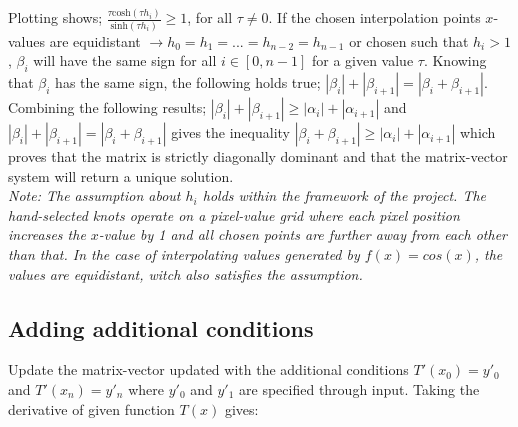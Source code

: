 \documentclass{article}
\newcommand{\T}[2]{\textbf{Task #1} -- #2:\\}
\begin{document}
  Plotting shows; $\frac{\tau \mathrm{cosh}(\tau h_i)}{\mathrm{sinh}(\tau h_i)}
  \geq 1$, for all $\tau \neq 0 $. If the chosen interpolation points
  $x$-values are equidistant $\rightarrow h_0 = h_1 = ... = h_{n-2} = h_{n-1}$ or
  chosen such that $h_i > 1$, $\beta_i$ will have the same sign for all $i \in
  [0,n-1]$ for a given value $\tau$. Knowing that $\beta_i$ has the same sign, the
  following holds true; $|\beta_i| + |\beta_{i+1}| = |\beta_i + \beta_{i+1}|$.
  \\

  Combining the following results; $ |\beta_i| + |\beta_{i+1}| \geq |\alpha_i|
  + |\alpha_{i+1}| $ and $|\beta_i| + |\beta_{i+1}| =
  |\beta_i + \beta_{i+1}|$ gives the inequality $|\beta_i + \beta_{i+1}| \geq |\alpha_i| +
  |\alpha_{i+1}|$ which proves that the matrix is strictly diagonally dominant
  and that the matrix-vector system will return a unique solution. \\

  \textit{Note: The assumption about $h_i$ holds within the framework of the
  project. The hand-selected knots operate on a pixel-value grid where each
  pixel position increases the $x$-value by 1 and all chosen points are further
  away from each other than that. In the case of interpolating values generated
  by $f(x) = cos(x)$, the values are equidistant, witch also satisfies the
  assumption.} \\

  \subsection*{Adding additional conditions}


  Update the matrix-vector updated with the additional conditions $T'(x_0) =
  y'_0$ and $T'(x_n) = y'_n$ where $y'_0$ and $y'_1$ are specified through
  input. Taking the derivative of given function $T(x)$ gives:
\end{document}
